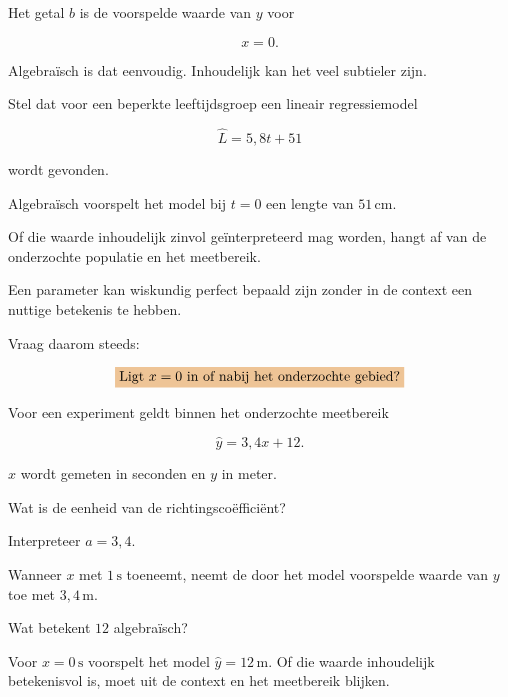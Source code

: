 \documentclass{ximera}
\begin{document}
Het getal $b$ is de voorspelde waarde van $y$ voor

\[
x=0.
\]

Algebraïsch is dat eenvoudig. Inhoudelijk kan het veel subtieler zijn.

\begin{voorbeeld}
Stel dat voor een beperkte leeftijdsgroep een lineair regressiemodel

\[
\hat L=5{,}8t+51
\]

wordt gevonden.

Algebraïsch voorspelt het model bij $t=0$ een lengte van
$51\,\mathrm{cm}$.

Of die waarde inhoudelijk zinvol geïnterpreteerd mag worden, hangt af
van de onderzochte populatie en het meetbereik.
\end{voorbeeld}

\begin{opmerking}
Een parameter kan wiskundig perfect bepaald zijn zonder in de context
een nuttige betekenis te hebben.

Vraag daarom steeds:

\[
\important{
\text{Ligt }x=0\text{ in of nabij het onderzochte gebied?}
}
\]
\end{opmerking}


\begin{oefening}{\oefB \ESS}

Voor een experiment geldt binnen het onderzochte meetbereik

\[
\hat y=3{,}4x+12.
\]

$x$ wordt gemeten in seconden en $y$ in meter.

\begin{question}
Wat is de eenheid van de richtingscoëfficiënt?

\begin{multipleChoice}
\end{multipleChoice}
\end{question}

\begin{question}
Interpreteer $a=3{,}4$.

\begin{oplossing}
Wanneer $x$ met $1\,\mathrm{s}$ toeneemt, neemt de door het model
voorspelde waarde van $y$ toe met $3{,}4\,\mathrm{m}$.
\end{oplossing}
\end{question}

\begin{question}
Wat betekent $12$ algebraïsch?

\begin{oplossing}
Voor $x=0\,\mathrm{s}$ voorspelt het model $\hat y=12\,\mathrm{m}$.
Of die waarde inhoudelijk betekenisvol is, moet uit de context en het
meetbereik blijken.
\end{oplossing}
\end{question}
\end{oefening}
\end{document}
